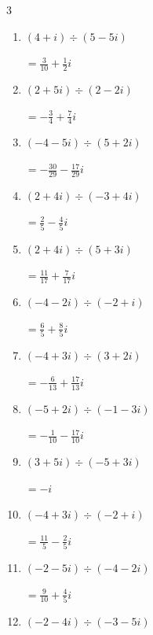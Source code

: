 \begin{multicols}{3}
\begin{enumerate}
        $\displaystyle =\frac{17}{41}+\frac{11}{41}i$

  \item $\displaystyle (4+i)\div(5-5i)$

        $\displaystyle =\frac{3}{10}+\frac{1}{2}i$

  \item $\displaystyle (2+5i)\div(2-2i)$

        $\displaystyle =-\frac{3}{4}+\frac{7}{4}i$

  \item $\displaystyle (-4-5i)\div(5+2i)$

        $\displaystyle =-\frac{30}{29}-\frac{17}{29}i$

  \item $\displaystyle (2+4i)\div(-3+4i)$

        $\displaystyle =\frac{2}{5}-\frac{4}{5}i$

  \item $\displaystyle (2+4i)\div(5+3i)$

        $\displaystyle =\frac{11}{17}+\frac{7}{17}i$

  \item $\displaystyle (-4-2i)\div(-2+i)$

        $\displaystyle =\frac{6}{5}+\frac{8}{5}i$

\columnbreak %

\resetques

  \item $\displaystyle (-4+3i)\div(3+2i)$

        $\displaystyle =-\frac{6}{13}+\frac{17}{13}i$

  \item $\displaystyle (-5+2i)\div(-1-3i)$

        $\displaystyle =-\frac{1}{10}-\frac{17}{10}i$

  \item $\displaystyle (3+5i)\div(-5+3i)$

        $\displaystyle =-i$

  \item $\displaystyle (-4+3i)\div(-2+i)$

        $\displaystyle =\frac{11}{5}-\frac{2}{5}i$

  \item $\displaystyle (-2-5i)\div(-4-2i)$

        $\displaystyle =\frac{9}{10}+\frac{4}{5}i$

  \item $\displaystyle (-2-4i)\div(-3-5i)$


\end{enumerate}
\end{multicols}
